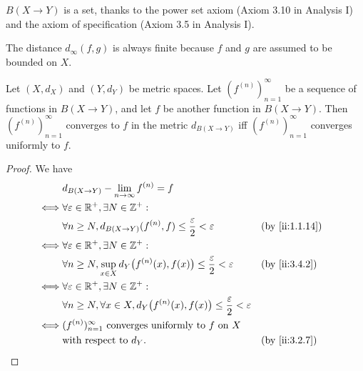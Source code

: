 \begin{note}
  \(B(X \to Y)\) is a set, thanks to the power set axiom (Axiom 3.10 in Analysis I) and the axiom of specification (Axiom 3.5 in Analysis I).
\end{note}

\begin{note}
  The distance \(d_\infty(f, g)\) is always finite because \(f\) and \(g\) are assumed to be bounded on \(X\).
\end{note}

\setcounter{thm}{3}
\begin{prop}\label{ii:3.4.4}
  Let \((X, d_X)\) and \((Y, d_Y)\) be metric spaces.
  Let \((f^{(n)})_{n = 1}^\infty\) be a sequence of functions in \(B(X \to Y)\), and let \(f\) be another function in \(B(X \to Y)\).
  Then \((f^{(n)})_{n = 1}^\infty\) converges to \(f\) in the metric \(d_{B(X \to Y)}\) iff \((f^{(n)})_{n = 1}^\infty\) converges uniformly to \(f\).
\end{prop}

\begin{proof}
  We have
  \begin{align*}
         & d_{B(X \to Y)} - \lim_{n \to \infty} f^{(n)} = f                                                                            \\
    \iff & \forall \varepsilon \in \R^+, \exists N \in \Z^+ :                                                                          \\
         & \forall n \geq N, d_{B(X \to Y)}(f^{(n)}, f) \leq \dfrac{\varepsilon}{2} < \varepsilon                     &  & \by{ii:1.1.14} \\
    \iff & \forall \varepsilon \in \R^+, \exists N \in \Z^+ :                                                                          \\
         & \forall n \geq N, \sup_{x \in X} d_Y\big(f^{(n)}(x), f(x)\big) \leq \dfrac{\varepsilon}{2} < \varepsilon   &  & \by{ii:3.4.2}  \\
    \iff & \forall \varepsilon \in \R^+, \exists N \in \Z^+ :                                                                          \\
         & \forall n \geq N, \forall x \in X, d_Y\big(f^{(n)}(x), f(x)\big) \leq \dfrac{\varepsilon}{2} < \varepsilon                  \\
    \iff & (f^{(n)})_{n = 1}^\infty \text{ converges uniformly to } f \text{ on } X                                                    \\
         & \text{with respect to } d_Y.                                                                               &  & \by{ii:3.2.7}
  \end{align*}
\end{proof}

